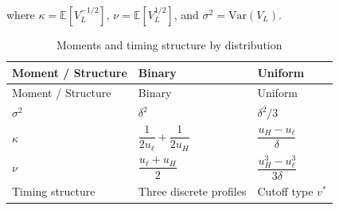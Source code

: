 \documentclass[
  english,
  a4paper,
  12pt]{article}
\newcommand{\E}{\mathbb{E}}
\newcommand{\Var}{\mathrm{Var}}
\theoremstyle{plain}
\theoremstyle{plain}
\theoremstyle{definition}
\theoremstyle{remark}
\begin{document}
where \(\kappa=\E[V_L^{-1/2}]\), \(\nu=\E[V_L^{1/2}]\), and
\(\sigma^2=\Var(V_L)\).

\bigskip

\begin{longtable}[]{@{}
  >{\raggedright\arraybackslash}p{}
  >{\raggedright\arraybackslash}p{}
  >{\raggedright\arraybackslash}p{}@{}}
\caption{Moments and timing structure by
distribution}\label{tbl-summary-distributions}\tabularnewline
\toprule\noalign{}
\begin{minipage}[b]{\linewidth}\raggedright
Moment / Structure
\end{minipage} & \begin{minipage}[b]{\linewidth}\raggedright
Binary
\end{minipage} & \begin{minipage}[b]{\linewidth}\raggedright
Uniform
\end{minipage} \\
\midrule\noalign{}
\endfirsthead
\toprule\noalign{}
\begin{minipage}[b]{\linewidth}\raggedright
Moment / Structure
\end{minipage} & \begin{minipage}[b]{\linewidth}\raggedright
Binary
\end{minipage} & \begin{minipage}[b]{\linewidth}\raggedright
Uniform
\end{minipage} \\
\midrule\noalign{}
\endhead
\bottomrule\noalign{}
\endlastfoot
\(\sigma^2\) & \(\delta^2\) & \(\delta^2/3\) \\
\(\kappa\) & \(\dfrac{1}{2u_\ell}+\dfrac{1}{2u_H}\) &
\(\dfrac{u_H-u_\ell}{\delta}\) \\
\(\nu\) & \(\dfrac{u_\ell+u_H}{2}\) &
\(\dfrac{u_H^3-u_\ell^3}{3\delta}\) \\
Timing structure & Three discrete profiles & Cutoff type \(v^*\) \\
\end{longtable}



\end{document}
